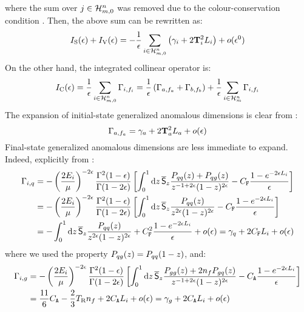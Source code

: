 where the sum over $ j \in \mathcal{H}^{n}_{m,0} $ was removed due to the colour-conservation condition . Then, the above sum can be rewritten as:
\begin{equation}
  I_\text{S}(\epsilon) + I_\text{V}(\epsilon) = - \frac{1}{\epsilon} \sum_{i \in \mathcal{H}^{n}_{m,0}} \left( \gamma_i + 2 \mathbf{T}_i^2 L_i \right) + o(\epsilon^0)
\end{equation}
On the other hand, the integrated collinear operator is:
\begin{equation*}
  I_\text{C}(\epsilon) = \frac{1}{\epsilon} \sum_{i \in \mathcal{H}^{n}_{m,0}} \Gamma_{i , f_i} = \frac{1}{\epsilon} \left( \Gamma_{a , f_a} + \Gamma_{b , f_b} \right) + \frac{1}{\epsilon} \sum_{i \in \mathcal{H}^{n}_{m}} \Gamma_{i , f_i}
\end{equation*}
The expansion of initial-state generalized anomalous dimensions is clear from :
\begin{equation}
  \Gamma_{a , f_a} = \gamma_a + 2 \mathbf{T}_a^2 L_a + o(\epsilon)
  \label{eq:gen-ad}
\end{equation}
Final-state generalized anomalous dimensions are less immediate to expand. Indeed, explicitly from :
\begin{equation*}
  \begin{split}
    \Gamma_{i , q}
    & = - \left( \frac{2E_i}{\mu} \right)^{-2\epsilon} \frac{\Gamma^2(1-\epsilon)}{\Gamma(1-2\epsilon)} \left[ \int_0^1 \mathrm{d} z\, \overline{\mathsf{S}}_z \frac{P_{qq}(z) + P_{qg}(z)}{z^{-1 + 2\epsilon} (1-z)^{2\epsilon}} - C_\mathtt{F} \frac{1 - e^{-2\epsilon L_i}}{\epsilon} \right] \\
    & = - \left( \frac{2E_i}{\mu} \right)^{-2\epsilon} \frac{\Gamma^2(1-\epsilon)}{\Gamma(1-2\epsilon)} \left[ \int_0^1 \mathrm{d} z\, \overline{\mathsf{S}}_z \frac{P_{qq}(z)}{z^{2\epsilon} (1-z)^{2\epsilon}} - C_\mathtt{F} \frac{1 - e^{-2\epsilon L_i}}{\epsilon} \right] \\
    & = - \int_0^1 \mathrm{d} z\, \overline{\mathsf{S}}_z \frac{P_{qq}(z)}{z^{2\epsilon} (1-z)^{2\epsilon}} + C_\mathtt{F}^2 \frac{1 - e^{-2\epsilon L_i}}{\epsilon} + o(\epsilon) = \gamma_q + 2 C_\mathtt{F} L_i + o(\epsilon)
  \end{split}
\end{equation*}
where we used the property $ P_{qg}(z) = P_{qq}(1 - z) $, and:
\begin{equation*}
  \begin{split}
    \Gamma_{i , g}
    & = - \left( \frac{2E_i}{\mu} \right)^{-2\epsilon} \frac{\Gamma^2(1-\epsilon)}{\Gamma(1-2\epsilon)} \left[ \int_0^1 \mathrm{d} z\, \overline{\mathsf{S}}_z \frac{P_{gg}(z) + 2n_f P_{gq}(z)}{z^{-1+2\epsilon}(1-z)^{2\epsilon}} - C_\mathtt{A} \frac{1 - e^{-2\epsilon L_i}}{\epsilon} \right] \\
    & = \frac{11}{6} C_\mathtt{A} - \frac{2}{3} T_\text{R} n_f + 2 C_\mathtt{A} L_i + o(\epsilon) = \gamma_g + 2 C_\mathtt{A} L_i + o(\epsilon)
  \end{split}
\end{equation*}
